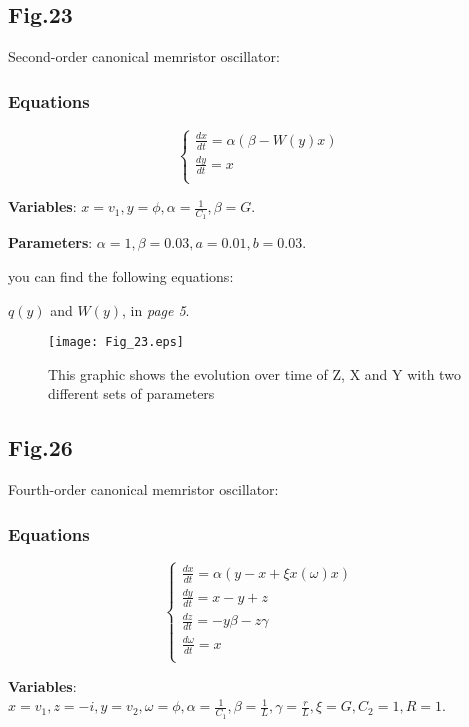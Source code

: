 \documentclass[12pt, a4paper]{paper}
\begin{document}
\newpage
\subsection{Fig.23}
Second-order canonical memristor oscillator:
\subsubsection{Equations}
\begin{equation}
\begin{cases}
\frac{dx}{dt}=\alpha(\beta-W(y)x)
\\
\frac{dy}{dt}=x
\\
\end{cases}
\end{equation}

\textbf{Variables}: $x=v_1, y=\phi, \alpha=\frac{1}{C_1},
\beta=G$.

\textbf{Parameters}: $\alpha =1, \beta =0.03, a=0.01, b=0.03$.

you can find the following equations: 

$q(y)$ and $W(y)$, in \textit{page 5}.

\begin{figure}[h]
\centering
\texttt{[image: Fig\_23.eps]}
\caption{This graphic shows the evolution over time of Z, X and Y with two different sets of parameters}
\end{figure}

\newpage
\subsection{Fig.26}
Fourth-order canonical memristor oscillator:
\subsubsection{Equations}
\begin{equation}
\begin{cases}
\frac{dx}{dt}=\alpha(y-x+\xi x(\omega)x)
\\
\frac{dy}{dt}=x-y+z
\\
\frac{dz}{dt}=-y\beta-z\gamma
\\
\frac{d\omega}{dt}=x
\\
\end{cases}
\end{equation}

\textbf{Variables}: $x=v_1, z=-i, y=v_2, \omega=\phi, \alpha=\frac{1}{C_1},
\beta=\frac{1}{L}, \gamma=\frac{r}{L}, \xi=G, C_2=1, R=1$.
\end{document}
